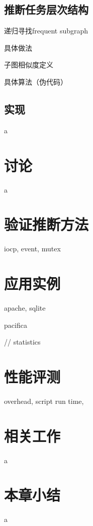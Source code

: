 \subsection{推断任务层次结构}

递归寻找frequent subgraph

具体做法

子图相似度定义

具体算法（伪代码）

\subsection{实现}

a

\section{讨论}

a

\section{验证推断方法}

iocp, event, mutex

\section{应用实例}

apache, sqlite

pacifica

// statistics

\section{性能评测}

overhead, script run time, 


\section{相关工作}

a

\section{本章小结}

a


